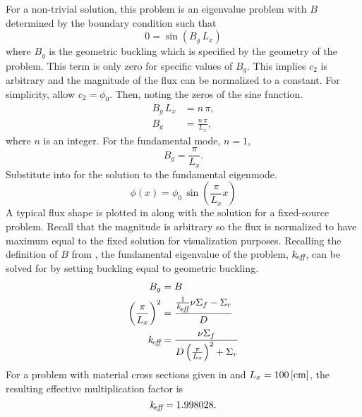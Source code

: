   For a non-trivial solution, this problem is an eigenvalue problem with $B$
  determined by the boundary condition such that 
  \begin{equation}
    0 = \sin(B_g \, L_x)
  \end{equation}
  where $B_g$ is the geometric buckling which is specified by the geometry of
  the problem. This term is only zero for specific values of $B_g$.
  This implies $c_2$ is arbitrary and the
  magnitude of the flux can be normalized to a constant. For simplicity, allow
  $c_2 = \phi_0$. Then, noting the zeros of the sine function.
  \begin{align}
    B_g \, L_x &= n \, \pi, \\
    B_g &= \frac{n \, \pi}{L_x},
  \end{align}
  where $n$ is an integer. For the fundamental mode, $n=1$,
  \begin{equation}
    \label{eq:1d1g_buckle_geom}
    B_g = \frac{\pi}{L_x}.
  \end{equation}
  Substitute  into  for the solution
  to the fundamental eigenmode.
  \begin{equation}
    \label{eq:analytic_1d1g}
    \phi(x) = \phi_0 \, \sin\left(\frac{\pi}{L_x} x \right)
  \end{equation}
  A typical flux shape is plotted in  along with the
  solution for a fixed-source problem. Recall that the magnitude is arbitrary so 
  the flux is normalized to have maximum equal to the fixed solution for 
  visualization purposes.
  Recalling the definition of $B$ from , the fundamental
  eigenvalue of the problem, $k_{\!\mbox{\scriptsize \em eff}}$, can be solved for by setting buckling
  equal to geometric buckling.
  \begin{align}
    B_g &= B \\
    \left( \frac{\pi}{L_x} \right)^2 &= 
      \frac{\frac{1}{k_{\!\mbox{\scriptsize \em eff}}} \nu \Sigma_f - \Sigma_r}{D} \\
    \label{eq:keff1d}
    k_{\!\mbox{\scriptsize \em eff}} &= \frac{\nu \Sigma_f}{D \left(\frac{\pi}{L_x}\right)^2 + \Sigma_r}
  \end{align}
  For a problem with material cross sections given in 
  and $L_x = 100 \left[\text{{cm}}\right]$, the resulting effective multiplication factor
  is
  \begin{equation}
    k_{\!\mbox{\scriptsize \em eff}} = 1.998028.
  \end{equation}


